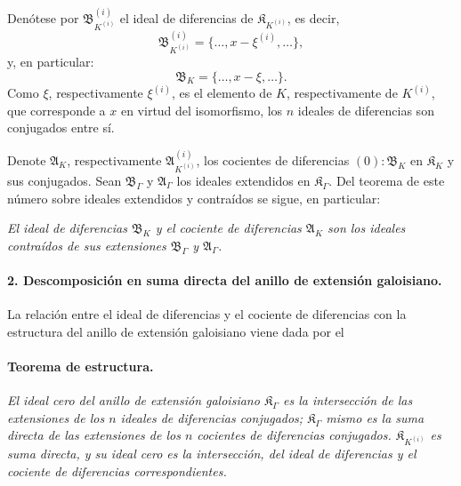 Denótese por $\mathfrak B_{K^{(i)}}^{(i)}$ el ideal de diferencias de $\mathfrak K_{K^{(i)}}$, es decir,
\[
\mathfrak B_{K^{(i)}}^{(i)}=\{\ldots,x-\xi^{(i)},\ldots\},
\]
y, en particular:
\[
\mathfrak B_K=\{\ldots,x-\xi,\ldots\}.
\]
Como $\xi$, respectivamente $\xi^{(i)}$, es el elemento de $K$, respectivamente de $K^{(i)}$, que corresponde a $x$ en virtud del isomorfismo, los $n$ ideales de diferencias son conjugados entre sí.

Denote $\mathfrak A_K$, respectivamente $\mathfrak A_{K^{(i)}}^{(i)}$, los cocientes de diferencias $(0):\mathfrak B_K$ en $\mathfrak K_K$ y sus conjugados. Sean $\mathfrak B_\Gamma$ y $\mathfrak A_\Gamma$ los ideales extendidos en $\mathfrak K_\Gamma$. Del teorema de este número sobre ideales extendidos y contraídos se sigue, en particular:

\emph{El ideal de diferencias $\mathfrak B_K$ y el cociente de diferencias $\mathfrak A_K$ son los ideales contraídos de sus extensiones $\mathfrak B_\Gamma$ y $\mathfrak A_\Gamma$.}

\paragraph{2. Descomposición en suma directa del anillo de extensión galoisiano.}
La relación entre el ideal de diferencias y el cociente de diferencias con la estructura del anillo de extensión galoisiano viene dada por el

\paragraph{Teorema de estructura.}
\emph{El ideal cero del anillo de extensión galoisiano $\mathfrak K_\Gamma$ es la intersección de las extensiones de los $n$ ideales de diferencias conjugados; $\mathfrak K_\Gamma$ mismo es la suma directa de las extensiones de los $n$ cocientes de diferencias conjugados. $\mathfrak K_{K^{(i)}}$ es suma directa, y su ideal cero es la intersección, del ideal de diferencias y el cociente de diferencias correspondientes.}

